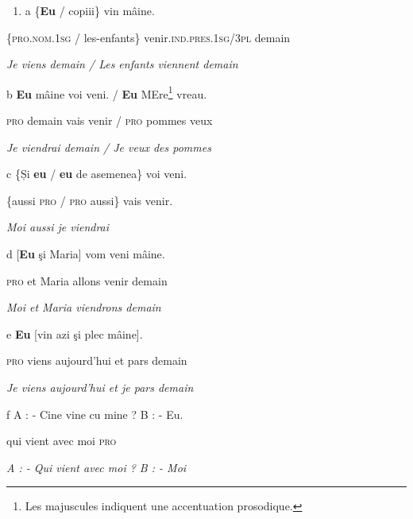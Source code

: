 \begin{enumerate}
\item \label{bkm:Ref299292497}a  \{\textbf{Eu}  / copiii\}  vin  mâine.  


\end{enumerate}
\{\textsc{pro.nom.1sg}  / les-enfants\}  venir.\textsc{ind.pres.1sg/3pl}  demain

{\itshape
Je viens demain / Les enfants viennent demain}

b  \textbf{Eu}  mâine  voi  veni.  / \textbf{Eu}  MEre\footnote{Les majuscules indiquent une accentuation prosodique.}  vreau.

\textsc{pro}  demain  vais  venir  / \textsc{pro}  pommes  veux

  \textit{Je viendrai demain / Je veux des pommes}

c  \{Și  \textbf{eu}  / \textbf{eu}  de asemenea\}  voi  veni.

  \{aussi  \textsc{pro}  / \textsc{pro}  aussi\}  vais  venir.

  \textit{Moi aussi je viendrai}

d  [\textbf{Eu}  şi  Maria]  vom  veni  mâine.

  \textsc{pro}  et  Maria  allons  venir  demain

  \textit{Moi et Maria viendrons demain}

e  \textbf{Eu}  [vin  azi  şi  plec  mâine].

  \textsc{pro}  viens  aujourd'hui  et  pars  demain

  \textit{Je viens aujourd'hui et je pars demain}

f  A : - Cine  vine  cu  mine ?  B :  - Eu.

  qui  vient  avec  moi    \textsc{pro} 

  \textit{A : - Qui vient avec moi ? B : - Moi} 


